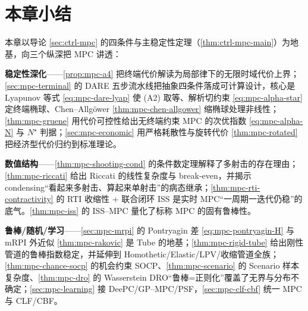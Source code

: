 \section*{本章小结}

本章以导论 \cref{sec:ctrl-mpc} 的四条件与主稳定性定理（\cref{thm:ctrl-mpc-main}）为地基，向三个纵深把 MPC 讲透：

\textbf{稳定性深化}——\cref{prop:mpc-a4} 把终端代价解读为局部律下的无限时域代价上界；\cref{sec:mpc-terminal} 的 DARE 五步流水线把抽象四条件落成可计算设计，核心是 Lyapunov 等式 \cref{eq:mpc-dare-lyap} 使 (A2) 取等、解析切约束 \cref{eq:mpc-alpha-star} 定终端椭球、Chen--Allgöwer \cref{thm:mpc-chen-allgower} 缩椭球处理非线性；\cref{thm:mpc-gruene} 用代价可控性给出无终端约束 MPC 的次优指数 \cref{eq:mpc-alpha-N} 与 $N^\star$ 判据；\cref{sec:mpc-economic} 用严格耗散性与旋转代价 \cref{thm:mpc-rotated} 把经济型代价归约到标准理论。

\textbf{数值结构}——\cref{thm:mpc-shooting-cond} 的条件数定理解释了多射击的存在理由；\cref{thm:mpc-riccati} 给出 Riccati 的线性复杂度与 break-even，并揭示 condensing“看起来多射击、算起来单射击”的病态继承；\cref{thm:mpc-rti-contractivity} 的 RTI 收缩性 + 联合闭环 ISS 是实时 MPC“一周期一迭代仍稳”的底气。\cref{thm:mpc-iss} 的 ISS--MPC 量化了标称 MPC 的固有鲁棒性。

\textbf{鲁棒/随机/学习}——\cref{sec:mpc-mrpi} 的 Pontryagin 差 \cref{eq:mpc-pontryagin-H} 与 mRPI 外近似 \cref{thm:mpc-rakovic} 是 Tube 的地基；\cref{thm:mpc-rigid-tube} 给出刚性管道的鲁棒指数稳定，并延伸到 Homothetic/Elastic/LPV/收缩管道全族；\cref{thm:mpc-chance-socp} 的机会约束 SOCP、\cref{thm:mpc-scenario} 的 Scenario 样本复杂度、\cref{thm:mpc-dro} 的 Wasserstein DRO“鲁棒=正则化”覆盖了无界与分布不确定；\cref{sec:mpc-learning} 接 DeePC/GP--MPC/PSF，\cref{sec:mpc-clf-cbf} 统一 MPC 与 CLF/CBF。

